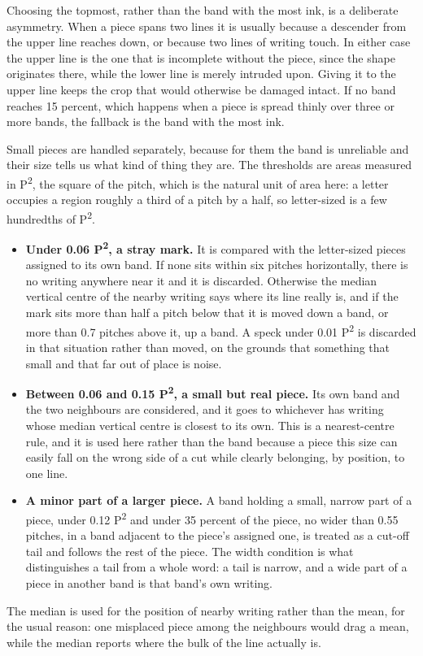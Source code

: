 Choosing the topmost, rather than the band with the most ink, is a deliberate asymmetry. When a piece spans two lines it is usually because a descender from the upper line reaches down, or because two lines of writing touch. In either case the upper line is the one that is incomplete without the piece, since the shape originates there, while the lower line is merely intruded upon. Giving it to the upper line keeps the crop that would otherwise be damaged intact. If no band reaches 15 percent, which happens when a piece is spread thinly over three or more bands, the fallback is the band with the most ink.


Small pieces are handled separately, because for them the band is unreliable and their size tells us what kind of thing they are. The thresholds are areas measured in P\textsuperscript{2}, the square of the pitch, which is the natural unit of area here: a letter occupies a region roughly a third of a pitch by a half, so letter-sized is a few hundredths of P\textsuperscript{2}.


\begin{itemize}\setlength\itemsep{0pt}
  \item \textbf{Under 0.06 P\textsuperscript{2}, a stray mark.} It is compared with the letter-sized pieces assigned to its own band. If none sits within six pitches horizontally, there is no writing anywhere near it and it is discarded. Otherwise the median vertical centre of the nearby writing says where its line really is, and if the mark sits more than half a pitch below that it is moved down a band, or more than 0.7 pitches above it, up a band. A speck under 0.01 P\textsuperscript{2} is discarded in that situation rather than moved, on the grounds that something that small and that far out of place is noise.
  \item \textbf{Between 0.06 and 0.15 P\textsuperscript{2}, a small but real piece.} Its own band and the two neighbours are considered, and it goes to whichever has writing whose median vertical centre is closest to its own. This is a nearest-centre rule, and it is used here rather than the band because a piece this size can easily fall on the wrong side of a cut while clearly belonging, by position, to one line.
  \item \textbf{A minor part of a larger piece.} A band holding a small, narrow part of a piece, under 0.12 P\textsuperscript{2} and under 35 percent of the piece, no wider than 0.55 pitches, in a band adjacent to the piece's assigned one, is treated as a cut-off tail and follows the rest of the piece. The width condition is what distinguishes a tail from a whole word: a tail is narrow, and a wide part of a piece in another band is that band's own writing.
\end{itemize}
The median is used for the position of nearby writing rather than the mean, for the usual reason: one misplaced piece among the neighbours would drag a mean, while the median reports where the bulk of the line actually is.


